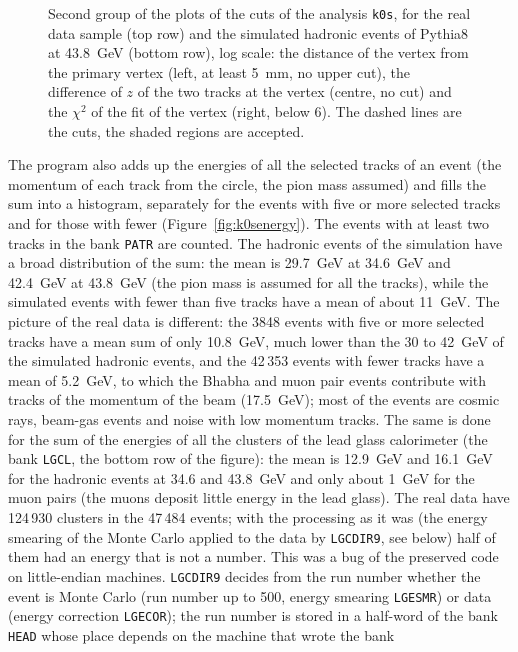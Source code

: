 \begin{figure}[H]
\centering
{}
\caption{Second group of the plots of the cuts of the analysis \texttt{k0s}, for the real data sample (top row) and the simulated hadronic events of Pythia8 at 43.8~GeV (bottom row), log scale: the distance of the vertex from the primary vertex (left, at least 5~mm, no upper cut), the difference of $z$ of the two tracks at the vertex (centre, no cut) and the $\chi^2$ of the fit of the vertex (right, below 6). The dashed lines are the cuts, the shaded regions are accepted.}
\label{fig:k0scuts}
\end{figure}

The program also adds up the energies of all the selected tracks of an event (the momentum of each track from the circle, the pion mass assumed) and fills the sum into a
histogram, separately for the events with five or more selected tracks and for those with fewer (Figure~\ref{fig:k0senergy}). The events with at least two tracks in the bank
\texttt{PATR} are counted. The hadronic events of the simulation have a broad distribution of the sum: the mean is 29.7~GeV at 34.6~GeV and 42.4~GeV at 43.8~GeV (the pion mass is
assumed for all the tracks), while the simulated events with fewer than five tracks have a mean of about 11~GeV. The picture of the real data is different: the 3848 events
with five or more selected tracks have a mean sum of only 10.8~GeV, much lower than the 30 to 42~GeV of the simulated hadronic events, and the 42\,353 events with
fewer tracks have a mean of 5.2~GeV, to which the Bhabha and muon pair events contribute with tracks of the momentum of the beam (17.5~GeV); most of the events are cosmic rays, beam-gas events and noise with low momentum tracks. The same is done for the sum of the energies of all the clusters of the lead glass calorimeter (the bank \texttt{LGCL}, the bottom row of the figure): the mean is 12.9~GeV and 16.1~GeV
for the hadronic events at 34.6 and 43.8~GeV and only about 1~GeV for the muon pairs (the muons deposit little energy in the lead glass). The real data have 124\,930 clusters in the 47\,484 events; with
the processing as it was (the energy smearing of the Monte Carlo applied to the data by \texttt{LGCDIR9}, see below) half of them had an energy that is not a number.
This was a bug of the preserved code on little-endian machines. \texttt{LGCDIR9} decides from the run number whether the event is Monte Carlo (run number up to 500, energy smearing
\texttt{LGESMR}) or data (energy correction \texttt{LGECOR}); the run number is stored in a half-word of the bank \texttt{HEAD} whose place depends on the machine that wrote the bank
